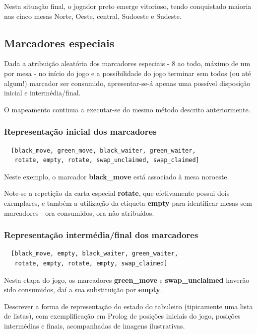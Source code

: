 \documentclass[a4paper]{article}
\begin{document}
Nesta situação final, o jogador preto emerge vitorioso, tendo conquistado maioria nas cinco mesas Norte, Oeste, central, Sudoeste e Sudeste. \newline

\subsection{Marcadores especiais}
Dada a atribuição aleatória dos marcadores especiais - 8 ao todo, máximo de um por mesa - no início do jogo e a possibilidade do jogo terminar sem todos (ou até algum!) marcador ser consumido, apresentar-se-á apenas uma possível disposição inicial e intermédia/final.

O mapeamento continua a executar-se do mesmo método descrito anteriormente.

\subsubsection{Representação inicial dos marcadores}
\begin{lstlisting}
  [black_move, green_move, black_waiter, green_waiter, 
   rotate, empty, rotate, swap_unclaimed, swap_claimed]
\end{lstlisting}

Neste exemplo, o marcador \textbf{black\_move} está associado à mesa noroeste.

Note-se a repetição da carta especial \textbf{rotate}, que efetivamente possui dois exemplares, e também a utilização da etiqueta \textbf{empty} para identificar mesas sem marcadores - ora consumidos, ora não atribuídos. \newline

\subsubsection{Representação intermédia/final dos marcadores}
\begin{lstlisting}
  [black_move, empty, black_waiter, green_waiter, 
   rotate, empty, rotate, empty, swap_claimed]
\end{lstlisting}

Nesta etapa do jogo, os marcadores \textbf{green\_move} e \textbf{swap\_unclaimed} haverão sido consumidos, daí a sua substituição por \textbf{empty}.

Descrever a forma de representação do estado do tabuleiro (tipicamente uma lista de listas), com exemplificação em Prolog de posições iniciais do jogo, posições intermédias e finais, acompanhadas de imagens ilustrativas. \newline
\end{document}
